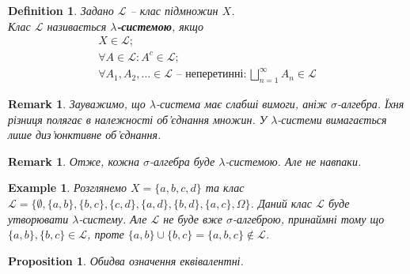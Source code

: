\documentclass[a4paper, 10pt]{article}
\theoremstyle{theoremdd}
\newtheorem{definition}[theorem]{Definition}
\newtheorem{example}[theorem]{Example}
\newtheorem{proposition}[theorem]{Proposition}
\newtheorem{remark}[theorem]{Remark}
\begin{document}
\begin{definition}
Задано $\mathcal{L}$ -- клас підмножин $X$.\\
Клас $\mathcal{L}$ називається \textbf{$\lambda$-системою}, якщо
\begin{align*}
X \in \mathcal{L}; \\
\forall A \in \mathcal{L}: A^c \in \mathcal{L}; \\
\forall A_1,A_2,\dots \in \mathcal{L} \text{ -- неперетинні}: \bigsqcup_{n=1}^\infty A_n \in \mathcal{L}
\end{align*}
\end{definition}

\begin{remark}
Зауважимо, що $\lambda$-система має слабші вимоги, аніж $\sigma$-алгебра. Їхня різниця полягає в належності об'єднання множин. У $\lambda$-системи вимагається лише диз'юнктивне об'єднання.
\end{remark}

\begin{remark}
Отже, кожна $\sigma$-алгебра буде $\lambda$-системою. Але не навпаки.
\end{remark}

\begin{example}
Розглянемо $X = \{a,b,c,d\}$ та клас $\mathcal{L} = \{\emptyset, \{a,b\}, \{b,c\}, \{c,d\}, \{a,d\}, \{b,d\}, \{a,c\}, \Omega\}$. Даний клас $\mathcal{L}$ буде утворювати $\lambda$-систему. Але $\mathcal{L}$ не буде вже $\sigma$-алгеброю, принаймні тому що $\{a,b\},\{b,c\} \in \mathcal{L}$, проте $\{a,b\} \cup \{b,c\} = \{a,b,c\} \notin \mathcal{L}$.
\end{example}

\begin{proposition}
Обидва означення еквівалентні.
\end{proposition}
\end{document}
